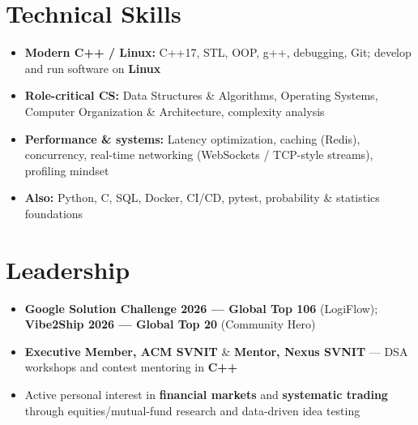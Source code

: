 \documentclass[a4paper,10pt]{article}
\begin{document}
\section{Technical Skills}
\small
\begin{itemize}[label={}]
  \item \textbf{Modern C++ / Linux:} C++17, STL, OOP, g++, debugging, Git; develop and run software on \textbf{Linux}
  \item \textbf{Role-critical CS:} Data Structures \& Algorithms, Operating Systems, Computer Organization \& Architecture, complexity analysis
  \item \textbf{Performance \& systems:} Latency optimization, caching (Redis), concurrency, real-time networking (WebSockets / TCP-style streams), profiling mindset
  \item \textbf{Also:} Python, C, SQL, Docker, CI/CD, pytest, probability \& statistics foundations
\end{itemize}

\section{Leadership}
\small
\begin{itemize}
  \item \textbf{Google Solution Challenge 2026 --- Global Top 106} (LogiFlow); \textbf{Vibe2Ship 2026 --- Global Top 20} (Community Hero)
  \item \textbf{Executive Member, ACM SVNIT} \& \textbf{Mentor, Nexus SVNIT} --- DSA workshops and contest mentoring in \textbf{C++}
  \item Active personal interest in \textbf{financial markets} and \textbf{systematic trading} through equities/mutual-fund research and data-driven idea testing
\end{itemize}
\end{document}
